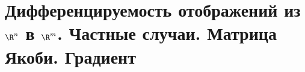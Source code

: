 \section{Дифференцируемость отображений из $\R^n$ в $\R^m$. Частные случаи. Матрица Якоби. Градиент}

